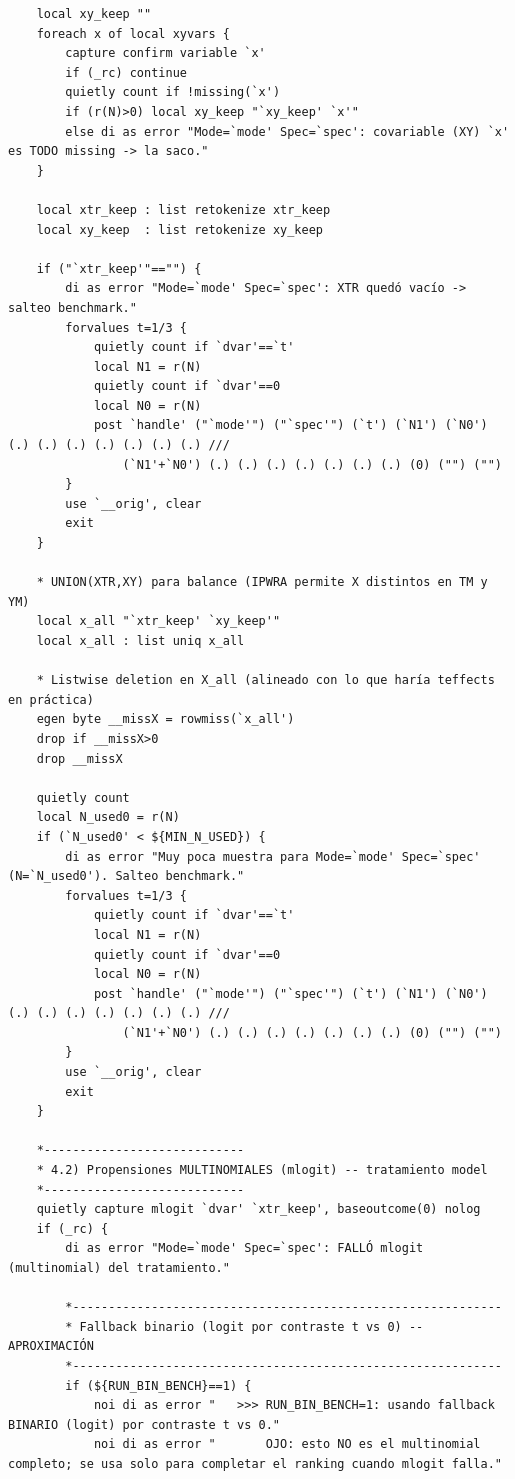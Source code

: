 \documentclass[12pt]{article}
\begin{document}
\begin{lstlisting}
    local xy_keep ""
    foreach x of local xyvars {
        capture confirm variable `x'
        if (_rc) continue
        quietly count if !missing(`x')
        if (r(N)>0) local xy_keep "`xy_keep' `x'"
        else di as error "Mode=`mode' Spec=`spec': covariable (XY) `x' es TODO missing -> la saco."
    }

    local xtr_keep : list retokenize xtr_keep
    local xy_keep  : list retokenize xy_keep

    if ("`xtr_keep'"=="") {
        di as error "Mode=`mode' Spec=`spec': XTR quedó vacío -> salteo benchmark."
        forvalues t=1/3 {
            quietly count if `dvar'==`t'
            local N1 = r(N)
            quietly count if `dvar'==0
            local N0 = r(N)
            post `handle' ("`mode'") ("`spec'") (`t') (`N1') (`N0') (.) (.) (.) (.) (.) (.) (.) ///
                (`N1'+`N0') (.) (.) (.) (.) (.) (.) (.) (0) ("") ("")
        }
        use `__orig', clear
        exit
    }

    * UNION(XTR,XY) para balance (IPWRA permite X distintos en TM y YM)
    local x_all "`xtr_keep' `xy_keep'"
    local x_all : list uniq x_all

    * Listwise deletion en X_all (alineado con lo que haría teffects en práctica)
    egen byte __missX = rowmiss(`x_all')
    drop if __missX>0
    drop __missX

    quietly count
    local N_used0 = r(N)
    if (`N_used0' < ${MIN_N_USED}) {
        di as error "Muy poca muestra para Mode=`mode' Spec=`spec' (N=`N_used0'). Salteo benchmark."
        forvalues t=1/3 {
            quietly count if `dvar'==`t'
            local N1 = r(N)
            quietly count if `dvar'==0
            local N0 = r(N)
            post `handle' ("`mode'") ("`spec'") (`t') (`N1') (`N0') (.) (.) (.) (.) (.) (.) (.) ///
                (`N1'+`N0') (.) (.) (.) (.) (.) (.) (.) (0) ("") ("")
        }
        use `__orig', clear
        exit
    }

    *----------------------------
    * 4.2) Propensiones MULTINOMIALES (mlogit) -- tratamiento model
    *----------------------------
    quietly capture mlogit `dvar' `xtr_keep', baseoutcome(0) nolog
    if (_rc) {
        di as error "Mode=`mode' Spec=`spec': FALLÓ mlogit (multinomial) del tratamiento."

        *------------------------------------------------------------
        * Fallback binario (logit por contraste t vs 0) -- APROXIMACIÓN
        *------------------------------------------------------------
        if (${RUN_BIN_BENCH}==1) {
            noi di as error "   >>> RUN_BIN_BENCH=1: usando fallback BINARIO (logit) por contraste t vs 0."
            noi di as error "       OJO: esto NO es el multinomial completo; se usa solo para completar el ranking cuando mlogit falla."


\end{lstlisting}
\end{document}
